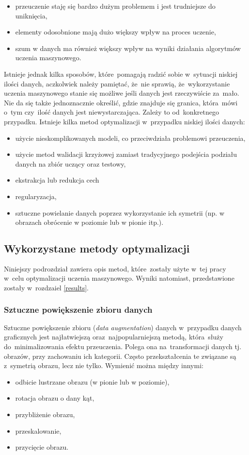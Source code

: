 \begin{itemize}
\item przeuczenie staję się bardzo dużym problemem i jest trudniejsze do uniknięcia,
\item elementy odosobnione mają dużo większy wpływ na proces uczenie,
\item szum w danych ma również większy wpływ na wyniki działania algorytmów uczenia maszynowego.
\end{itemize}
Istnieje jednak kilka sposobów, które~pomagają radzić sobie w~sytuacji niskiej ilości danych, aczkolwiek należy pamiętać, że~nie sprawią, że~wykorzystanie uczenia maszynowego stanie się możliwe jeśli danych jest rzeczywiście za~mało. Nie da się także jednoznacznie określić, gdzie znajduje się granica, która~mówi o~tym czy~ilość danych jest niewystarczająca. Zależy to od~konkretnego przypadku. Istnieje kilka metod optymalizacji w~przypadku niskiej ilości danych:
\begin{itemize}
\item użycie nieskomplikowanych modeli, co przeciwdziała problemowi przeuczenia,
\item użycie metod walidacji krzyżowej zamiast tradycyjnego podejścia podziału danych na zbiór uczący oraz testowy,
\item ekstrakcja lub redukcja cech
\item regularyzacja,
\item sztuczne powielanie danych poprzez wykorzystanie ich symetrii (np. w obrazach obrócenie w poziomie lub w pionie itp.).
\end{itemize}


\subsection{Wykorzystane metody optymalizacji}
Niniejszy podrozdział zawiera opis metod, które~zostały użyte w~tej pracy w~celu optymalizacji uczenia maszynowego. Wyniki 
natomiast, przedstawione zostały w~rozdzaiel \ref{results}.
\subsubsection{Sztuczne powiększenie zbioru danych}
Sztuczne powiększenie zbioru (\textit{data augmentation}) danych w~przypadku danych graficznych jest najłatwiejszą oraz~najpopularniejszą metodą, która~służy do~minimalizowania efektu przeuczenia\cite{dataaugment}. Polega ona na~transformacji danych tj. obrazów, przy zachowaniu ich kategorii. Często przekształcenia te związane są z~symetrią obrazu, lecz nie tylko. Wymienić można między innymi:
\begin{itemize}
\item odbicie lustrzane obrazu (w pionie lub w poziomie),
\item rotacja obrazu o dany kąt,
\item przybliżenie obrazu,
\item przeskalowanie,
\item przycięcie obrazu.
\end{itemize}

